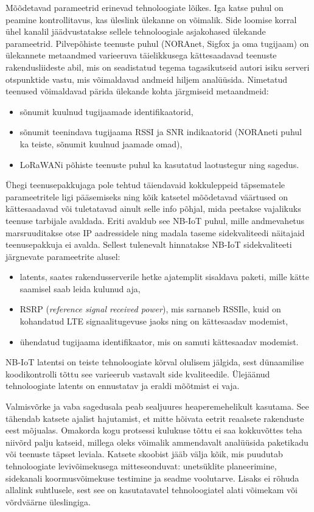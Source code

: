 \documentclass[12pt]{article}
\begin{document}
    Mõõdetavad parameetrid erinevad tehnoloogiate lõikes.
    Iga katse puhul on peamine kontrollitavus, kas üleslink ülekanne on võimalik.
    Side loomise korral ühel kanalil jäädvustatakse sellele tehnoloogiale asjakohased ülekande parameetrid.
    Pilvepõhiste teenuste puhul (NORAnet, Sigfox ja oma tugijaam) on ülekannete metaandmed varieeruva täielikkusega kättesaadavad teenuste rakendusliideste abil, mis on seadistatud tegema tagasikutseid autori isiku serveri otspunktide vastu, mis võimaldavad andmeid hiljem analüüsida.
    Nimetatud teenused võimaldavad pärida ülekande kohta järgmiseid metaandmeid:
    \begin{itemize}
        \item sõnumit kuulnud tugijaamade identifikaatorid,
        \item sõnumit teenindava tugijaama RSSI ja SNR indikaatorid (NORAneti puhul ka teiste, sõnumit kuulnud jaamade omad),
        \item LoRaWANi põhiste teenuste puhul ka kasutatud laotustegur ning sagedus.
    \end{itemize}
    Ühegi teenusepakkujaga pole tehtud täiendavaid kokkuleppeid täpsematele parameetritele ligi pääsemiseks ning kõik katsetel mõõdetavad väärtused on kättesaadavad või tuletatavad ainult selle info põhjal, mida peetakse vajalikuks teenuse tarbijale avaldada.
    Eriti avaldub see NB-IoT puhul, mille andmevahetus marsruuditakse otse IP aadressidele ning madala taseme sidekvaliteedi näitajaid teenusepakkuja ei avalda.
    Sellest tulenevalt hinnatakse NB-IoT sidekvaliteeti järgnevate parameetrite alusel:
    \begin{itemize}
        \item latents, saates rakendusserverile hetke ajatemplit sisaldava paketi, mille kätte saamisel saab leida kulunud aja,
        \item RSRP (\textit{reference signal received power}), mis sarnaneb RSSIle, kuid on kohandatud LTE signaalitugevuse jaoks ning on kättesaadav modemist,
        \item ühendatud tugijaama identifikaator, mis on samuti kättesaadav modemist.
    \end{itemize}
    NB-IoT latentsi on teiste tehnoloogiate kõrval olulisem jälgida, sest dünaamilise koodikontrolli tõttu see varieerub vastavalt side kvaliteedile.
    Ülejäänud tehnoloogiate latents on ennustatav ja eraldi mõõtmist ei vaja.

    Valmisvõrke ja vaba sagedusala peab sealjuures heaperemehelikult kasutama.
    See tähendab katsete ajalist hajutamist, et mitte hõivata eetrit reaalsete rakenduste eest mõjualas.
    Omakorda kogu protsessi kulukuse tõttu ei saa kokkuvõttes teha niivõrd palju katseid, millega oleks võimalik ammendavalt analüüsida paketikadu või teenuste täpset leviala.
    Katsete skoobist jääb välja kõik, mis puudutab tehnoloogiate levivõimekusega mitteseonduvat: unetsüklite planeerimine, sidekanali koormusvõimekuse testimine ja seadme voolutarve.
    Lisaks ei rõhuda allalink suhtlusele, sest see on kasutatavatel tehnoloogiatel alati võimekam või võrdväärne üleslingiga.
\end{document}
